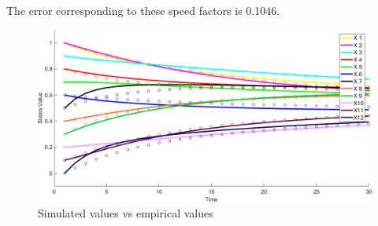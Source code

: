 \documentclass[a4paper]{article}
\begin{document}
The error corresponding to these speed factors is 0.1046.

\begin{figure}[H]
\center
\includegraphics[width=\textwidth]{res/img/plotdiff2}
\caption{Simulated values vs empirical values }
\label{fig:plotdiff2}
\end{figure}
\end{document}
